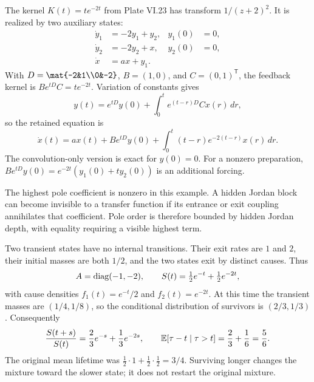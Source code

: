 The kernel $K(t)=te^{-2t}$ from Plate VI.23 has transform $1/(z+2)^2$. It is realized by two auxiliary states:
\[
\begin{aligned}
\dot y_1&=-2y_1+y_2,& y_1(0)&=0,\\
\dot y_2&=-2y_2+x,& y_2(0)&=0,\\
\dot x&=a x+y_1.&
\end{aligned}
\]
With $D=\mat{-2&1\\0&-2}$, $B=(1,0)$, and $C=(0,1)^{\mathsf T}$, the feedback kernel is $Be^{tD}C=te^{-2t}$.
Variation of constants gives
\[
y(t)=e^{tD}y(0)+\int_0^t e^{(t-r)D}Cx(r)\,dr,
\]
so the retained equation is
\[
\dot x(t)=a x(t)+Be^{tD}y(0)
+\int_0^t (t-r)e^{-2(t-r)}x(r)\,dr.
\]
The convolution-only version is exact for $y(0)=0$. For a nonzero preparation, $Be^{tD}y(0)=e^{-2t}(y_1(0)+t y_2(0))$ is an additional forcing.

The highest pole coefficient is nonzero in this example. A hidden Jordan block can become invisible to a transfer function if its entrance or exit coupling annihilates that coefficient. Pole order is therefore bounded by hidden Jordan depth, with equality requiring a visible highest term.

Two transient states have no internal transitions. Their exit rates are $1$ and $2$, their initial masses are both $1/2$, and the two states exit by distinct causes. Thus
\[
A=\operatorname{diag}(-1,-2),\qquad
S(t)=\tfrac12e^{-t}+\tfrac12e^{-2t},
\]
with cause densities $f_1(t)=e^{-t}/2$ and $f_2(t)=e^{-2t}$.
At this time the transient masses are $(1/4,1/8)$, so the conditional distribution of survivors is $(2/3,1/3)$. Consequently
\[
\frac{S(t+s)}{S(t)}=\frac23e^{-s}+\frac13e^{-2s},
\qquad
\EE[\tau-t\mid\tau>t]=\frac23+\frac16=\frac56.
\]
The original mean lifetime was $\tfrac12\cdot1+\tfrac12\cdot\tfrac12=3/4$. Surviving longer changes the mixture toward the slower state; it does not restart the original mixture.

